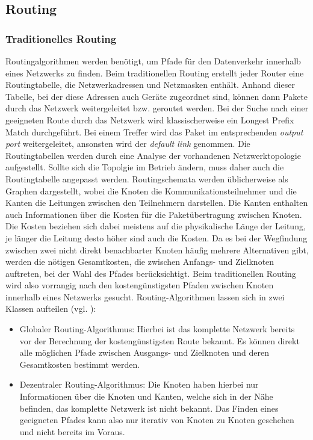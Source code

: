 
\subsection{Routing}
\subsubsection{Traditionelles Routing}
Routingalgorithmen werden benötigt, um Pfade für den Datenverkehr innerhalb eines Netzwerks zu finden. Beim traditionellen Routing erstellt jeder Router eine Routingtabelle, die Netzwerkadressen und Netzmasken enthält. Anhand dieser Tabelle, bei der diese Adressen auch Geräte zugeordnet sind, können dann Pakete durch das Netzwerk weitergeleitet bzw. geroutet werden. Bei der Suche nach einer geeigneten Route durch das Netzwerk wird klassischerweise ein Longest Prefix Match durchgeführt. Bei einem Treffer wird das Paket im entsprechenden \textit{output port} weitergeleitet, ansonsten wird der \textit{default link} genommen. Die Routingtabellen werden durch eine Analyse der vorhandenen Netzwerktopologie aufgestellt. Sollte sich die Topolgie im Betrieb ändern, muss daher auch die Routingtabelle angepasst werden. Routingschemata werden üblicherweise als Graphen dargestellt, wobei die Knoten die Kommunikationsteilnehmer und die Kanten die Leitungen zwischen den Teilnehmern darstellen. Die Kanten enthalten auch Informationen über die Kosten für die Paketübertragung zwischen Knoten. Die Kosten beziehen sich dabei meistens auf die physikalische Länge der Leitung, je länger die Leitung desto höher sind auch die Kosten. Da es bei der Wegfindung zwischen zwei nicht direkt benachbarter Knoten häufig mehrere Alternativen gibt, werden die nötigen Gesamtkosten, die zwischen Anfangs- und Zielknoten auftreten, bei der Wahl des Pfades berücksichtigt. Beim traditionellen Routing wird also vorrangig nach den kostengünstigsten Pfaden zwischen Knoten innerhalb eines Netzwerks gesucht. Routing-Algorithmen lassen sich in zwei Klassen aufteilen (vgl. \citet[S. 394]{Kurose2008}):
\begin{itemize}
\item Globaler Routing-Algorithmus: Hierbei ist das komplette Netzwerk bereits vor der Berechnung der kostengünstigsten Route bekannt. Es können direkt alle möglichen Pfade zwischen Ausgangs- und Zielknoten und deren Gesamtkosten bestimmt werden.
\item Dezentraler Routing-Algorithmus: Die Knoten haben hierbei nur Informationen über die Knoten und Kanten, welche sich in der Nähe befinden, das komplette Netzwerk ist nicht bekannt. Das Finden eines geeigneten Pfades kann also nur iterativ von Knoten zu Knoten geschehen und nicht bereits im Voraus.  
\end{itemize}
